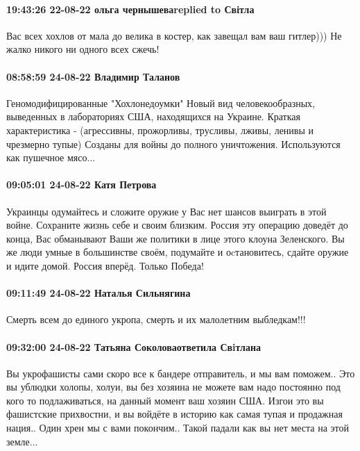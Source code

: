 \paragraph{19:43:26 22-08-22 ольга чернышеваreplied to Світла}

Вас всех хохлов от мала до велика в костер, как завещал вам ваш гитлер))) Не
жалко никого ни одного всех сжечь!

\paragraph{08:58:59 24-08-22 Владимир Таланов}

Геномодифицированные "Хохлонедоумки"
Новый вид человекообразных, выведенных в лабораториях США, находящихся на Украине. Краткая характеристика -
(агрессивны, прожорливы, трусливы, лживы,
ленивы и чрезмерно тупые)
Созданы для войны до полного уничтожения. Используются как пушечное мясо...

\paragraph{09:05:01 24-08-22 Катя Петрова}

Украинцы одумайтесь и сложите оружие у Вас нет шансов выиграть в этой войне.
Сохраните жизнь себе и своим близким. Россия эту операцию доведёт до конца, Вас
обманывают Ваши же политики в лице этого клоуна Зеленского. Вы же люди умные в
большинстве своём, подумайте и оcтановитесь, сдайте оружие и идите домой.
Россия вперёд. Только Победа!

\paragraph{09:11:49 24-08-22 Наталья Сильнягина}

Смерть всем до единого укропа, смерть и их малолетним выбледкам!!!

\paragraph{09:32:00 24-08-22 Татьяна Соколоваответила Свiтлана}

Вы укрофашисты сами скоро все к бандере отправитель, и мы вам поможем.. Это вы
ублюдки холопы, холуи, вы без хозяина не можете вам надо постоянно под кого то
подлаживаться, на данный момент ваш хозяин США. Изгои это вы фашистские
прихвостни, и вы войдёте в историю как самая тупая и продажная нация.. Один
хрен мы с вами покончим.. Такой падали как вы нет места на этой земле...

